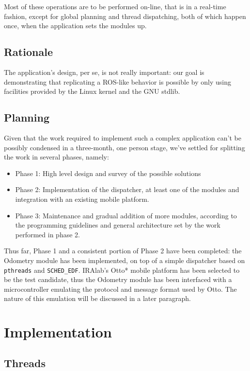 \documentclass[a4paper,12pt]{report}
\begin{document}
Most of these operations are to be performed on-line, that is in a real-time
fashion, except for global planning and thread dispatching, both of
which happen once, when the application sets the modules up. 

\subsection{Rationale}

The application's design, per se, is not really important: our goal is
demonstrating that replicating a ROS-like behavior is possible by only
using facilities provided by the Linux kernel and the GNU stdlib.  

\subsection{Planning}

Given that the work required to implement such a complex application can't be possibly
condensed in a three-month, one person stage, we've settled for
splitting the work in several phases, namely:
\begin{itemize}
\item Phase 1: High level design and survey of the possible solutions
\item Phase 2: Implementation of the dispatcher, at least one of the
  modules and integration with an existing mobile platform. 
\item Phase 3: Maintenance and gradual addition of more modules,
  according to the programming guidelines and general architecture set
  by the work performed in phase 2. 
\end{itemize}

Thus far, Phase 1 and a consistent portion of Phase 2 have been
completed: the Odometry module has been implemented, on top of a
simple dispatcher based on \texttt{pthreads} and \texttt{SCHED\_EDF}.
IRAlab's Otto* mobile platform has been selected to be the test
candidate, thus the Odometry module has been interfaced with a
microcontroller emulating the protocol and message format used by
Otto. The nature of this emulation will be discussed in a later
paragraph. %

\section{Implementation}
\subsection{Threads}
\end{document}
